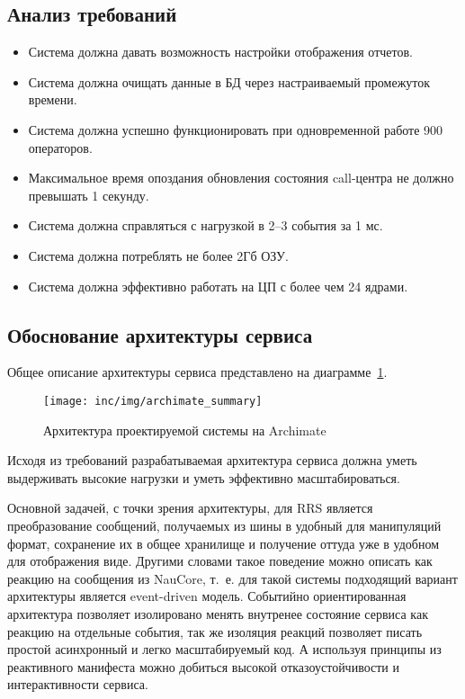 \subsection{Анализ требований}

\begin{itemize}
    \item Система должна давать возможность настройки отображения отчетов.
    \item Система должна очищать данные в БД через настраиваемый промежуток времени.
    \item Система должна успешно функционировать при одновременной работе 900 операторов.
    \item Максимальное время опоздания обновления состояния call-центра не должно превышать 1 секунду.
    \item Система должна справляться с нагрузкой в 2--3 события за 1 мс.
    \item Система должна потреблять не более 2Гб ОЗУ.
    \item Система должна эффективно работать на ЦП с более чем 24 ядрами.
\end{itemize}

\subsection{Обоснование архитектуры сервиса}

Общее описание архитектуры сервиса представлено на диаграмме~\ref{pic:archimate:summary}. %

\begin{figure}[ht]
    \centering
    \texttt{[image: inc/img/archimate\_summary]}
    \caption{Архитектура проектируемой системы на Archimate}
    \label{pic:archimate:summary}
\end{figure}

Исходя из требований разрабатываемая архитектура
сервиса должна уметь выдерживать высокие нагрузки и уметь эффективно масштабироваться.

Основной задачей, с точки зрения архитектуры,
для RRS является преобразование сообщений, получаемых из шины в удобный для манипуляций формат,
сохранение их в общее хранилище и получение оттуда уже в удобном для отображения виде.
Другими словами такое поведение можно описать как реакцию на сообщения из NauCore,
т.~е. для такой системы подходящий вариант архитектуры является event-driven модель. %
Событийно ориентированная архитектура позволяет изолировано менять внутренее состояние сервиса как реакцию на
отдельные события, так же изоляция реакций позволяет писать простой асинхронный и легко масштабируемый код.
А используя принципы из реактивного манифеста можно добиться высокой отказоустойчивости и интерактивности сервиса. %

